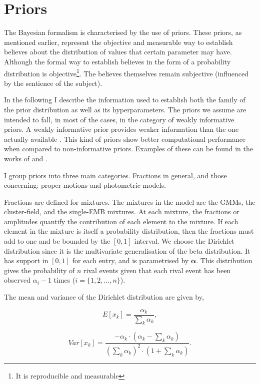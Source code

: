 \section{Priors}
\label{sect:priors}
The Bayesian formalism is characterised by the use of priors. These priors, as mentioned earlier, represent the objective and measurable way to establish believes about the distribution of values that certain parameter may have. Although the formal way to establish believes in the form of a probability distribution is objective\footnote{It is reproducible and measurable}. The believes themselves remain subjective (influenced by the sentience of the subject). 

In the following I describe the information used to establish both the family of the prior distribution as well as its hyperparameters. The priors we assume are intended to fall, in most of the cases, in the category of weakly informative priors. A weakly informative prior provides weaker information than the one actually available \citet{Gelman2006}. This kind of priors show better computational performance when compared to non-informative priors. Examples of these can be found in the works of \citet{Gelman2008} and \citet{Chung2015}. 

I group priors into three main categories. Fractions in general, and those concerning: proper motions and photometric models. 

Fractions are defined for mixtures. The mixtures in the model are the GMMs, the cluster-field, and the single-EMB mixtures. At each mixture, the fractions or amplitudes quantify the contribution of each element to the mixture. If each element in the mixture is itself a probability distribution, then the fractions must add to one and be bounded by the $[0,1]$ interval. We choose the Dirichlet distribution since it is the multivariate generalisation of the beta distribution. It has support in $[0,1]$ for each entry, and is parametrised by $\boldsymbol{\alpha}$. This distribution gives the probability of $n$ rival events given that each rival event has been observed $\alpha_i-1$ times ($i=\{1,2,...,n\}$).

The mean and variance of the Dirichlet distribution are given by,

\begin{equation}
E[x_k]=\frac{\alpha_k}{\sum_k \alpha_k},
\end{equation}

\begin{equation}
Var[x_k]=\frac{-\alpha_k\cdot (\alpha_k -\sum_k \alpha_k)}{(\sum_k \alpha_k)^2 \cdot (1+\sum_k \alpha_k)}.
\end{equation}

